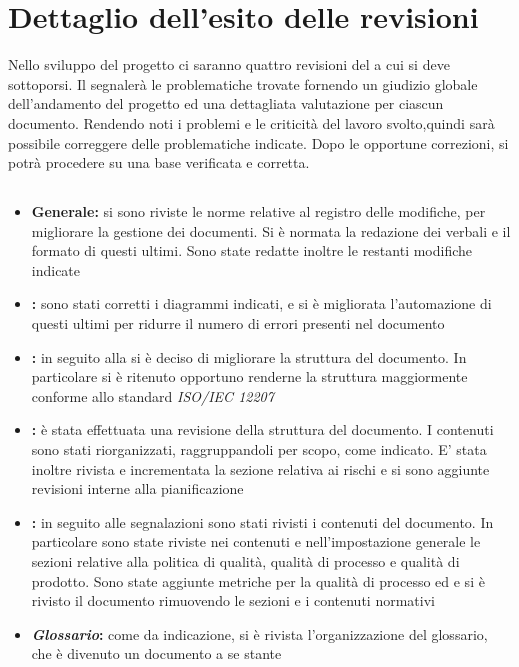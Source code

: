 \documentclass[12pt,a4paper]{article}
\begin{document}
	\newpage
	\section{Dettaglio dell'esito delle revisioni}
	Nello sviluppo del progetto ci saranno quattro revisioni del  a cui si deve sottoporsi. Il  segnalerà le problematiche trovate fornendo un giudizio globale dell'andamento del progetto ed una dettagliata valutazione per ciascun documento. Rendendo noti i problemi e le criticità del lavoro svolto,quindi sarà possibile correggere delle problematiche indicate. Dopo le opportune correzioni, si potrà procedere su una base verificata e corretta.
	
	\subsection{\RR}
	\begin{itemize}
		\item \textbf{Generale:} si sono riviste le norme relative al registro delle modifiche, per migliorare la gestione dei documenti. Si è normata la redazione dei verbali e il formato di questi ultimi. Sono state redatte inoltre le restanti modifiche indicate
		\item \textbf{\AdR{}:} sono stati corretti i diagrammi indicati, e si è migliorata l'automazione di questi ultimi per ridurre il numero di errori presenti nel documento
		\item \textbf{\NdP{}:} in seguito alla \RR{} si è deciso di migliorare la struttura del documento. In particolare si è ritenuto opportuno renderne la struttura maggiormente conforme allo standard \textit{ISO/IEC 12207}
		\item \textbf{\PdP{}:} è stata effettuata una revisione della struttura del documento. I contenuti sono stati riorganizzati, raggruppandoli per scopo, come indicato. E' stata inoltre rivista e incrementata la sezione relativa ai rischi e si sono aggiunte revisioni interne alla pianificazione
		\item \textbf{\PdQ{}:} in seguito alle segnalazioni sono stati rivisti i contenuti del documento. In particolare sono state riviste nei contenuti e nell'impostazione generale le sezioni relative alla politica di qualità, qualità di processo e qualità di prodotto. Sono state aggiunte metriche per la qualità di processo ed e si è rivisto il documento rimuovendo le sezioni e i contenuti normativi
		\item \textbf{\textit{Glossario}:} come da indicazione, si è rivista l'organizzazione del glossario, che è divenuto un documento a se stante
	\end{itemize}
	
\end{document}

